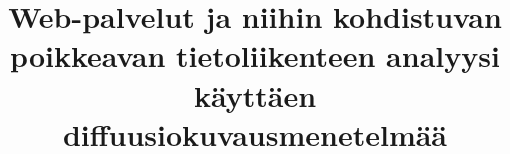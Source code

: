 \documentclass[finnish,logo,nonumbib,creativecommons,nocopyright,lof,pdftex,palatino,utf8]{gradu2}
\title{Web-palvelut ja niihin kohdistuvan poikkeavan tietoliikenteen
  analyysi käyttäen diffuusiokuvausmenetelmää}
\begin{document}



\mainmatter












{}
%


\appendix

%
%
\end{document}
